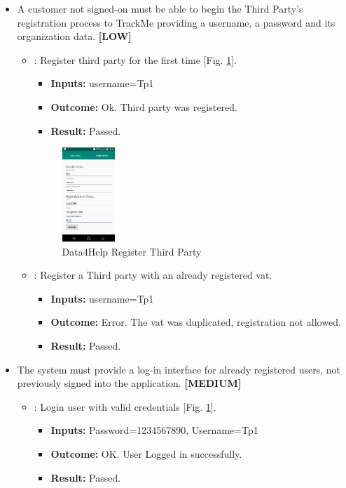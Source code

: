 \documentclass[a4paper, hidelinks, 12pt]{report}
\newcommand\requirement[1]{\item[{[REQ-#1]}] }
\newcommand\test[1]{\item[{[TEST-#1]}] }
\begin{document}
\begin{itemize}
		\requirement{2} A customer not signed-on must be able to begin the Third Party’s registration process to TrackMe providing a username, a password and its organization data. \textbf{[LOW]}
		\begin{itemize}
		\test{3}: Register third party for the first time [Fig. \ref{fig:register_third_party}].
			\begin{itemize}
			\item \textbf{Inputs: } username=Tp1			
			\item \textbf{Outcome: } Ok. Third party was registered.
			\item \textbf{Result: } Passed. 
			\end{itemize}
			
		\begin{figure}[H]
					\centering
				\includegraphics[width=0.2\textwidth]{images/register_third_party.jpeg}
					\caption[Data4Help Register Third Party]{Data4Help Register Third Party}
				\label{fig:register_third_party}
			\end{figure}
			
		\test{4}: Register a Third party with an already registered vat.
			\begin{itemize}
			\item \textbf{Inputs: } username=Tp1
			\item \textbf{Outcome: } Error. The vat was duplicated, registration not allowed.
			\item \textbf{Result: } Passed. 
			 \end{itemize}	
	\end{itemize}
	
\requirement{3}The system must provide a log-in interface for already registered users, not previously signed into the application. \textbf{[MEDIUM]}
		\begin{itemize}
		\test{5}: Login user with valid credentials [Fig. \ref{fig:register_third_party}].
			\begin{itemize}
			\item \textbf{Inputs: }Password=1234567890, Username=Tp1			
			\item \textbf{Outcome: } OK. User Logged in successfully.
			\item \textbf{Result: } Passed. 
			\end{itemize}
			

\end{itemize}
\end{itemize}
\end{document}
